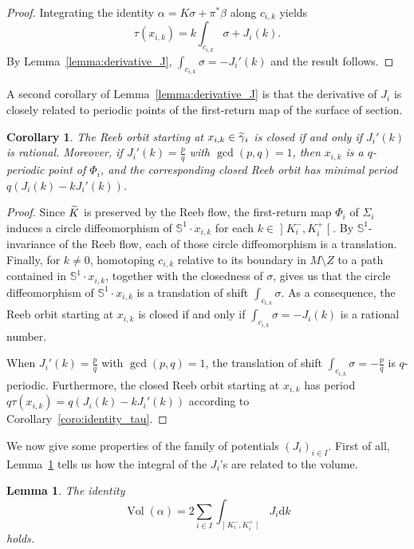 \documentclass[10pt,a4paper]{amsart}
\DeclareMathOperator{\vol}{Vol}
\newcommand{\bbS}{\mathbb{S}}
\newcommand{\rmd}{\mathrm{d}}
\let\oldtilde\tilde
\renewcommand*{\tilde}[1]{\mathchoice{\widetilde{#1}}{\widetilde{#1}}{\oldtilde{#1}}{\oldtilde{#1}}}
\newtheorem{lemm}[theo]{Lemma}
\newtheorem{coro}[theo]{Corollary}
\theoremstyle{definition}\newtheorem{defi}[theo]{Definition}
\begin{document}
\begin{proof}
Integrating the identity $\alpha = K \sigma + \pi ^* \beta$ along $c_{i,k}$ yields
\[
\tau(x_{i,k}) = k \int_{c_{i,k}}\sigma + J_i(k).
\]
By Lemma~\ref{lemma:derivative_J}, $\int_{c_{i,k}}\sigma = - J_i'(k)$ and the result follows.
\end{proof}

A second corollary of Lemma~\ref{lemma:derivative_J} is that the derivative of $J_i$ is closely related to periodic points of the first-return map of the surface of section.

\begin{coro}\label{coro:periodic_point}
The Reeb orbit starting at $x_{i,k} \in \tilde \gamma_i$ is closed if and only if $J_i'(k)$ is rational. Moreover, if $J_i'(k) = \frac{p}{q}$ with $\gcd(p,q)=1$, then $x_{i,k}$ is a $q$-periodic point of $\Phi_i$, and the corresponding closed Reeb orbit has minimal period $q(J_i(k) - k J_i'(k))$.
\end{coro}

\begin{proof}
Since $\tilde K$ is preserved by the Reeb flow, the first-return map $\Phi_i$ of $\Sigma_i$ induces a circle diffeomorphism of $\bbS^1 \cdot x_{i,k}$ for each $k \in\mathopen{]}K_i^-, K_i^+\mathclose{[}$. By $\bbS^1$-invariance of the Reeb flow, each of those circle diffeomorphism is a translation. Finally, for $k \neq 0$, homotoping $c_{i,k}$ relative to its boundary in $M \setminus Z$ to a path contained in $\bbS^1 \cdot x_{i,k}$, together with the closedness of $\sigma$, gives us that the circle diffeomorphism of $\bbS^1 \cdot x_{i,k}$ is a translation of shift $\int_{c_{i,k}} \sigma$. As a consequence, the Reeb orbit starting at $x_{i,k}$ is closed if and only if $\int_{c_{i,k}} \sigma = -J_i(k)$ is a rational number.

When $J_i'(k) = \frac{p}{q}$ with $\gcd(p,q)=1$, the translation of shift $\int_{c_{i,k}} \sigma = - \frac{p}{q}$ is $q$-periodic. Furthermore, the closed Reeb orbit starting at $x_{i,k}$ has period $q \tau(x_{i,k}) = q(J_i(k) - k J_i'(k))$ according to Corollary~\ref{coro:identity_tau}.
\end{proof}

We now give some properties of the family of potentials $(J_i)_{i \in I}$. First of all, Lemma~\ref{lemma:J_volume} tells us how the integral of the $J_i$'s are related to the volume.

\begin{lemm}\label{lemma:J_volume}
The identity
\[
\vol(\alpha) = 2 \sum_{i \in I} \int_{\mathopen{]}K_i^-, K_i^+\mathclose{[}}J_i \rmd k
\]
holds.
\end{lemm}
\end{document}
